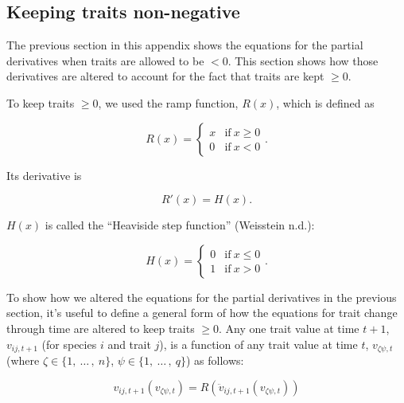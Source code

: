\subsection*{Keeping traits non-negative}


The previous section in this appendix shows the equations for the
partial derivatives when traits are allowed to be $<0$.
This section shows how those derivatives are altered to account for
the fact that traits are kept $\ge 0$.


To keep traits $\ge 0$, we used the ramp function, $R(x)$, which is defined as

\begin{equation*}
    R(x) = \begin{cases}
        x & \text{if}\ x \ge 0 \\
        0 & \text{if}\ x < 0
        \end{cases}
    \text{.}
\end{equation*}


\noindent Its derivative is

\begin{equation*}
    R'(x) = H(x).
\end{equation*}

\noindent $H(x)$ is called the ``Heaviside step function'' (Weisstein n.d.):

\begin{equation*}
    H(x) = \begin{cases}
        0 & \text{if}\ x \le 0 \\
        1 & \text{if}\ x > 0
        \end{cases}
    \text{.}
\end{equation*}



To show how we altered the equations for the partial derivatives
in the previous section, it's useful to define a general form of how
the equations for trait change through time are altered to keep traits $\ge 0$.
Any one trait value at time $t+1$,
$v_{ij,t+1}$ (for species $i$ and trait $j$),
is a function of any trait value at time $t$, $v_{\zeta\psi,t}$
(where $\zeta \in \{ 1, \: \ldots \, , \: n \}$,
$\psi \in \{ 1, \: \ldots \, , \: q \}$)
as follows:

\begin{equation*}
    v_{ij,t+1}(v_{\zeta\psi,t}) = R(\ddot{v}_{ij,t+1}(v_{\zeta\psi,t}))
\end{equation*}

